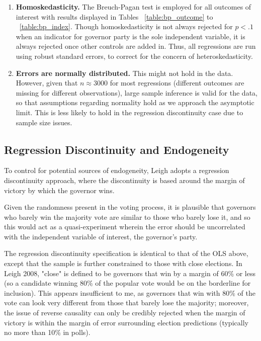 \documentclass{article}
\begin{document}
\begin{enumerate}
\item \textbf{Homoskedasticity.} The Breuch-Pagan test is employed for all outcomes of interest with results displayed in Tables ~\ref{table:bp_outcome} to ~\ref{table:bp_index}. Though homoskedasticity is not always rejected for $p < .1$ when an indicator for governor party is the sole independent variable, it is always rejected once other controls are added in. Thus, all regressions are run using robust standard errors, to correct  for the concern of heteroskedasticity.

\item \textbf{Errors are normally distributed.} This might not hold in the data. However, given that $n \approx 3000$ for most regressions (different outcomes are missing for different observations), large sample inference is valid for the data, so that assumptions regarding normality hold as we approach the asymptotic limit. This is less likely to hold in the regression discontinuity case due to sample size issues.
\end{enumerate}


\subsection{Regression Discontinuity and Endogeneity}

To control for potential sources of endogeneity, Leigh adopts a regression discontinuity approach, where the discontinuity is based around the margin of victory by which the governor wins.

Given the randomness present in the voting process, it is plausible that governors who barely win the majority vote are similar to those who barely lose it, and so this would act as a quasi-experiment wherein the error should be uncorrelated with the independent variable of interest, the governor's party. 

The regression discontinuity specification is identical to that of the OLS above, except that the sample is further constrained to those with close elections. In Leigh 2008, "close" is defined to be governors that win by a margin of 60\% or less (so a candidate winning 80\% of the popular vote would be on the borderline for inclusion). This appears insufficient to me, as governors that win with 80\% of the vote can look very different from those that barely lose the majority; moreover, the issue of reverse causality can only be credibly rejected when the margin of victory is within the margin of error surrounding election predictions (typically no more than 10\% in polls).
\end{document}
